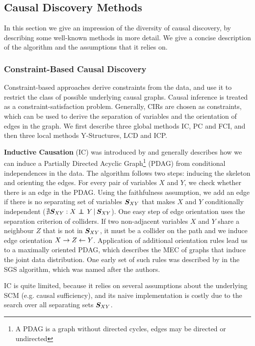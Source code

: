 \subsection{Causal Discovery Methods}

In this section we give an impression of the diversity of causal discovery, by describing some well-known methods in more detail. We give a concise description of the algorithm and the assumptions that it relies on.

\subsubsection{Constraint-Based Causal Discovery}
Constraint-based approaches derive constraints from the data, and use it to restrict the class of possible underlying causal graphs. Causal inference is treated as a constraint-satisfaction problem. Generally, CIRs are chosen as constraints, which can be used to derive the separation of variables and the orientation of edges in the graph. We first describe three global methods IC, PC and FCI, and then three local methods Y-Structures, LCD and ICP.

\textbf{Inductive Causation} (IC) was introduced by \citet{verma1991equivalence} and generally describes how we can induce a Partially Directed Acyclic Graph\footnote{A PDAG is a graph without directed cycles, edges may be directed or undirected} (PDAG) from conditional independences in the data. The algorithm follows two steps: inducing the skeleton and orienting the edges. For every pair of variables $X$ and $Y$, we check whether there is an edge in the PDAG. Using the faithfulness assumption, we add an edge if there is no separating set of variables $\bm{S}_{XY}$ that makes $X$ and $Y$ conditionally independent ($\nexists \bm{S}_{XY} : {X} \operatorname*{{\,\perp\mkern-12mu\perp\,}}_{} {Y} \,|\, {\bm{S}_{XY}}$). One easy step of edge orientation uses the separation criterion of colliders. If two non-adjacent variables $X$ and $Y$ share a neighbour $Z$ that is not in $\bm{S}_{XY}$, it must be a collider on the path and we induce edge orientation $X\to Z \leftarrow Y$. Application of additional orientation rules lead us to a maximally oriented PDAG, which describes the MEC of graphs that induce the joint data distribution. One early set of such rules was described by \citet{spirtes2000causation} in the SGS algorithm, which was named after the authors.
            
IC is quite limited, because it relies on several assumptions about the underlying SCM (e.g. causal sufficiency), and its naive implementation is costly due to the search over all separating sets $\bm{S}_{XY}$.

